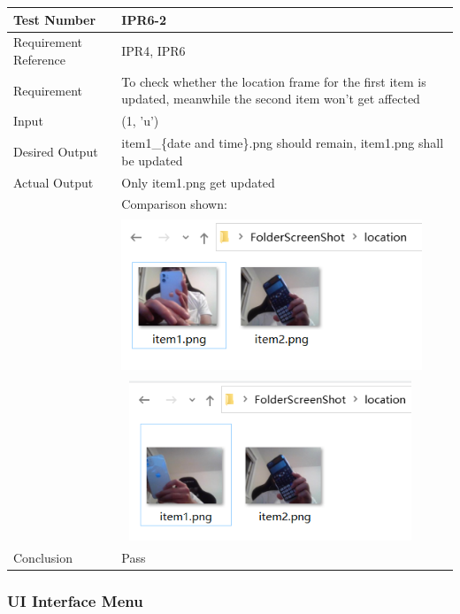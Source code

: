 \documentclass[12pt, titlepage]{article}
\begin{document}
\begin{table}[H]
\begin{center}
\begin{tabular}{|l | m{9cm}|}
\hline
  Test Number & IPR6-2\\
  \hline
  Requirement Reference & IPR4, IPR6\\
  \hline
  Requirement &  To check whether the location frame for the first item is updated, meanwhile the second item won't get affected\\
  \hline
  Input & (1, 'u')\\
  \hline
  Desired Output & item1\_\{date and time\}.png should remain, item1.png shall be updated\\
  \hline
  Actual Output & Only item1.png get updated\\&Comparison shown:\\&\includegraphics[width=90mm, height=46mm]{UT41.png}\\&\includegraphics[width=89mm, height=48mm]{UT42.png}\\
  \hline
  Conclusion & Pass\\
  \hline
\end{tabular}
\end{center}           
\end{table}
\subsubsection{UI Interface Menu}
\end{document}
